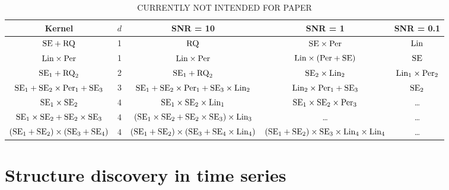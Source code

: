 \documentclass[twoside]{article}
\begin{document}
\begin{table}[ht!]
\caption{{\small
CURRENTLY NOT INTENDED FOR PAPER
}}
\label{tbl:synthetic}
\begin{center}
{\tiny
\begin{tabular}{c c | c c c}

Kernel & $d$ & SNR = 10 & SNR = 1 & SNR = 0.1 \\
\hline
$\textrm{SE} + \textrm{RQ}$                               & 1 & $\textrm{RQ}$
                                              & $\textrm{SE} \times \textrm{Per}$
                                              & $\textrm{Lin}$ \\
$\textrm{Lin} \times \textrm{Per}$                        & 1 & $\textrm{Lin} \times \textrm{Per}$ 
                                              & $\textrm{Lin} \times (\textrm{Per} + \textrm{SE})$
                                              & $\textrm{SE}$ \\
$\textrm{SE}_1 + \textrm{RQ}_2$                           & 2 & $\textrm{SE}_1 + \textrm{RQ}_2$
                                              & $\textrm{SE}_2 \times \textrm{Lin}_2$ 
                                              & $\textrm{Lin}_1 \times \textrm{Per}_2$\\
$\textrm{SE}_1 + \textrm{SE}_2 \times \textrm{Per}_1 + \textrm{SE}_3$     & 3 & $\textrm{SE}_1 + \textrm{SE}_2 \times \textrm{Per}_1 + \textrm{SE}_3 \times \textrm{Lin}_2$
                                              & $\textrm{Lin}_2 \times \textrm{Per}_1 + \textrm{SE}_3$
                                              & $\textrm{SE}_2$ \\
$\textrm{SE}_1 \times \textrm{SE}_2$                      & 4 & $\textrm{SE}_1 \times \textrm{SE}_2 \times \textrm{Lin}_1$
                                              & $\textrm{SE}_1 \times \textrm{SE}_2 \times \textrm{Per}_3$
                                              & \dots\\
$\textrm{SE}_1 \times \textrm{SE}_2 + \textrm{SE}_2 \times \textrm{SE}_3$ & 4 & $(\textrm{SE}_1 \times \textrm{SE}_2 + \textrm{SE}_2 \times \textrm{SE}_3) \times \textrm{Lin}_3$
                                              & \dots
                                              & \dots \\
$(\textrm{SE}_1 + \textrm{SE}_2) \times (\textrm{SE}_3 + \textrm{SE}_4)$  & 4 & $(\textrm{SE}_1 + \textrm{SE}_2) \times (\textrm{SE}_3 + \textrm{SE}_4\times\textrm{Lin}_4)$
                                              & $(\textrm{SE}_1 + \textrm{SE}_2) \times \textrm{SE}_3 \times \textrm{Lin}_4 \times \textrm{Lin}_4$
                                              & \dots \\
\end{tabular}
}
\end{center}
\end{table}

\section{Structure discovery in time series}
\end{document}
